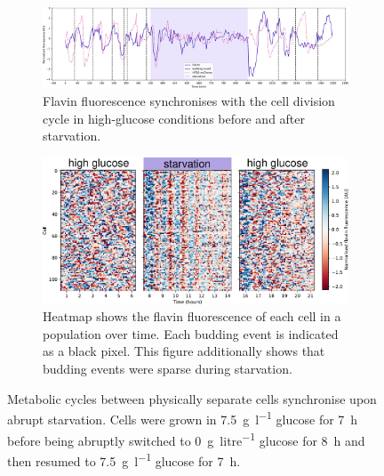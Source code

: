 \begin{figure}
  \centering
  \begin{subfigure}[htpb]{0.9\textwidth}
   \centering
   \includegraphics[width=\textwidth]{starvation_single_birth_plot_new_edit.pdf}
   \caption{
     Flavin fluorescence synchronises with the cell division cycle in high-glucose conditions before and after starvation.
   }
   \label{fig:biology-starvation-single}
  \end{subfigure}

  \begin{subfigure}[htpb]{0.7\textwidth}
   \centering
   \includegraphics[width=\textwidth]{heatmap_012_edit.pdf}
   \caption{
     Heatmap shows the flavin fluorescence of each cell in a population over time.
     Each budding event is indicated as a black pixel.
     This figure additionally shows that budding events were sparse during starvation.
   }
   \label{fig:biology-starvation-heatmap}
  \end{subfigure}

  \caption{
     Metabolic cycles between physically separate cells synchronise upon abrupt starvation.
     Cells were grown in \SI{7.5}{\gram~\litre^{-1}} glucose for \SI{7}{\hour} before being abruptly switched to \SI{0}{\gram~litre^{-1}} glucose for \SI{8}{\hour} and then resumed to \SI{7.5}{\gram~\litre^{-1}} glucose for \SI{7}{\hour}.
  }
  \label{fig:biology-starvation}
\end{figure}


